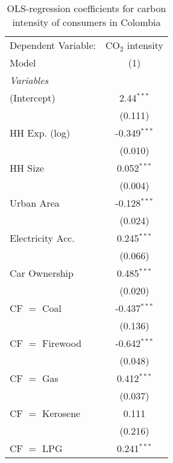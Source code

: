 
\begin{table}[htbp!]
   \centering
   \small
   \begin{adjustbox}{width = 1\textwidth, max height = 0.95\textheight, center}
      \begin{threeparttable}[b]
         \caption{\label{tab:OLS_1_COL} OLS-regression coefficients for carbon intensity of consumers in Colombia}
         \begin{tabular}{lc}
            \tabularnewline \midrule \midrule
            Dependent Variable: & CO$_{2}$ intensity\\  
            Model               & (1)\\  
            \midrule
            \emph{Variables}\\
            (Intercept)         & 2.44$^{***}$\\   
                                & (0.111)\\   
            HH Exp. (log)       & -0.349$^{***}$\\   
                                & (0.010)\\   
            HH Size             & 0.052$^{***}$\\   
                                & (0.004)\\   
            Urban Area          & -0.128$^{***}$\\   
                                & (0.024)\\   
            Electricity Acc.    & 0.245$^{***}$\\   
                                & (0.066)\\   
            Car Ownership       & 0.485$^{***}$\\   
                                & (0.020)\\   
            CF $=$ Coal         & -0.437$^{***}$\\   
                                & (0.136)\\   
            CF $=$ Firewood     & -0.642$^{***}$\\   
                                & (0.048)\\   
            CF $=$ Gas          & 0.412$^{***}$\\   
                                & (0.037)\\   
            CF $=$ Kerosene     & 0.111\\   
                                & (0.216)\\   
            CF $=$ LPG          & 0.241$^{***}$\\   

\end{tabular}
\end{threeparttable}
\end{adjustbox}
\end{table}
